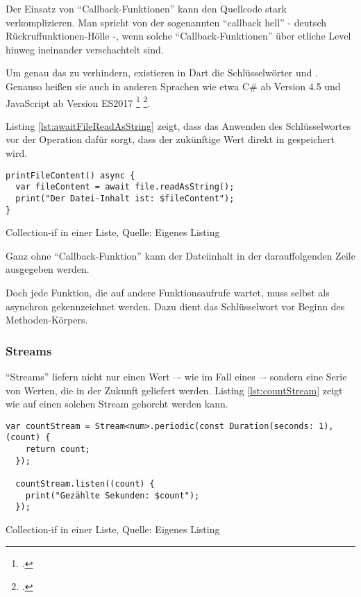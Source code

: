 Der Einsatz von \enquote{Callback-Funktionen} kann den Quellcode stark verkomplizieren.
 Man spricht von der sogenannten \enquote{callback hell} - deutsch Rückruffunktionen-Hölle -, wenn solche \enquote{Callback-Funktionen} über etliche Level hinweg ineinander verschachtelt sind.

Um genau das zu verhindern, existieren in Dart die Schlüsselwörter  und .
Genauso heißen sie auch in anderen Sprachen wie etwa C\# ab Version 4.5 und JavaScript ab Version ES2017
\footcite[Vgl.][]{asyncfunctionJavaScriptMDN}
\footcite[Vgl.][]{Asynchronousprogrammingwithasyncandawait}.





Listing \ref{lst:awaitFileReadAsString}
zeigt, dass das Anwenden des Schlüsselwortes  vor der Operation  dafür sorgt, dass der zukünftige Wert direkt in  gespeichert wird.

\ifIncludeFigures
  \begin{listing}[ht]
    \begin{verbatim}
printFileContent() async {
  var fileContent = await file.readAsString();
  print("Der Datei-Inhalt ist: $fileContent");
}
\end{verbatim}
    \caption[Collection-if in einer Liste]{Collection-if in einer Liste, Quelle: Eigenes Listing}
    \label{lst:awaitFileReadAsString}
  \end{listing}
\fi

Ganz ohne \enquote{Callback-Funktion} kann der Dateiinhalt in der darauffolgenden Zeile ausgegeben werden.





Doch jede Funktion, die auf andere Funktionsaufrufe wartet, muss selbst als asynchron gekennzeichnet werden.
Dazu dient das  Schlüsselwort vor Beginn des Methoden-Körpers.

\subsubsection{Streams}

\enquote{Streams} liefern nicht nur einen Wert –- wie im Fall eines  –- sondern eine Serie von Werten, die in der Zukunft geliefert werden.
Listing \ref{lst:countStream} zeigt wie auf einen solchen Stream gehorcht werden kann.
\ifIncludeFigures
  \begin{listing}[ht]
    \begin{verbatim}
var countStream = Stream<num>.periodic(const Duration(seconds: 1), (count) {
    return count;
  });

  countStream.listen((count) {
    print("Gezählte Sekunden: $count");
  });
\end{verbatim}
    \caption[Collection-if in einer Liste]{Collection-if in einer Liste, Quelle: Eigenes Listing}
    \label{lst:countStream}
  \end{listing}
\fi

